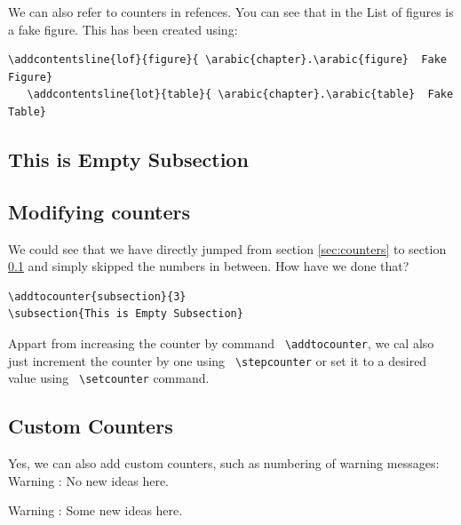 \documentclass[a4paper,10pt]{report} %
\begin{document}
  We can also refer to counters in refences. You can see that in the List of figures is a fake figure. This has been created using: 
  
  
   \begin{lstlisting}[language={[latex]tex}, frame=single,basicstyle=\footnotesize]
   \addcontentsline{lof}{figure}{ \arabic{chapter}.\arabic{figure}  Fake Figure}
   \addcontentsline{lot}{table}{ \arabic{chapter}.\arabic{table}  Fake Table}
\end{lstlisting}
  

\addtocounter{subsection}{3}
\subsection{This is Empty Subsection}\label{sec:empty}

\subsection{Modifying counters}

We could see that we have directly jumped from section \ref{sec:counters} to section \ref{sec:empty} and simply skipped the numbers in between.
How have we done that?
\begin{lstlisting}[language={[latex]tex},
frame=single,basicstyle=\footnotesize]
\addtocounter{subsection}{3}
\subsection{This is Empty Subsection}  
\end{lstlisting}

Appart from increasing the counter by command \texttt{ \textbackslash addtocounter}, we cal also just increment the counter by one using \texttt{ \textbackslash stepcounter} or set it to a desired value using \texttt{ \textbackslash setcounter} command. 
  
\subsection{Custom Counters}
Yes, we can also add custom counters, such as numbering of warning messages:\\

 Warning :  No new ideas here.\\
 \addtocounter{warning}{4}
 Warning :  Some new ideas here.\\
 
\end{document}
